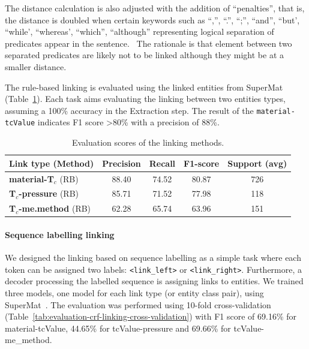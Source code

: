 \documentclass{article}
\newcommand{\tc}{T$_{c}$}
\begin{document}
The distance calculation is also adjusted with the addition of ``penalties'', that is, the distance is doubled when certain keywords such as ``,'', ``.'', ``;'', ``and'', ``but', ``while', ``whereas', ``which'', ``although'' representing logical separation of predicates appear in the sentence.~\cite{oka2021table} The rationale is that element between two separated predicates are likely not to be linked although they might be at a smaller distance. 

The rule-based linking is evaluated using the linked entities from SuperMat~\cite{foppiano2021supermat} (Table~\ref{table:evaluation-linking}). 
Each task aims evaluating the linking between two entities types, assuming a 100\% accuracy in the Extraction step. 
The result of the \texttt{material-tcValue} indicates F1 score >80\% with a precision of 88\%.

\begin{table}[ht]
\centering\small
\begin{tabular}{lcccc}
\toprule 
\textbf{Link type} (Method) & \textbf{Precision} & \textbf{Recall} & \textbf{F1-score} & Support (avg) \\ 
\midrule
\textbf{material-\tc} (RB)      &  88.40    & 74.52 &    80.87 &   726  \\
\textbf{\tc-pressure} (RB)      & 85.71  &  71.52  &  77.98  &  118     \\
\textbf{\tc-me.method} (RB)     & 62.28 & 65.74 &  63.96  &  151 \\
\bottomrule
\end{tabular}
\caption{\label{table:evaluation-linking} Evaluation scores of the linking methods. }
\end{table}

\paragraph{Sequence labelling linking} We designed the linking based on sequence labelling as a simple task where each token can be assigned two labels: \texttt{<link\_left>} or \texttt{<link\_right>}. 
Furthermore, a decoder processing the labelled sequence is assigning links to entities.
We trained three models, one model for each link type (or entity class pair), using SuperMat~\cite{foppiano2021supermat}.
The evaluation was performed using 10-fold cross-validation (Table~\ref{tab:evaluation-crf-linking-cross-validation}) with F1 score of 69.16\% for material-tcValue, 44.65\% for tcValue-pressure and 69.66\% for tcValue-me\_method. 
\end{document}
